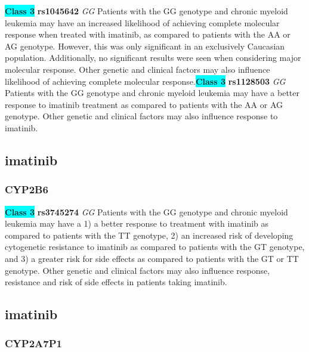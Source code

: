 \documentclass{book}
\begin{document}
\begin{center}
\textbf{\colorbox{cyan} {Class 3}} \textbf{ rs1045642 } \textit{ GG }
Patients with the GG genotype and chronic myeloid leukemia may have an increased likelihood of achieving complete molecular response when treated with imatinib, as compared to patients with the AA or AG genotype. However, this was only significant in an exclusively Caucasian population. Additionally, no significant results were seen when considering major molecular response. Other genetic and clinical factors may also influence likelihood of achieving complete molecular response.\textbf{\colorbox{cyan} {Class 3}} \textbf{ rs1128503 } \textit{ GG }
Patients with the GG genotype and chronic myeloid leukemia may have a better response to imatinib treatment as compared to patients with the AA or AG genotype. Other genetic and clinical factors may also influence response to imatinib. 


\end{center}\subsection{ imatinib }


\subsubsection{ CYP2B6 }

\begin{center}
\textbf{\colorbox{cyan} {Class 3}} \textbf{ rs3745274 } \textit{ GG }
Patients with the GG genotype and chronic myeloid leukemia may have a 1) a better response to treatment with imatinib as compared to patients with the TT genotype, 2) an increased risk of developing cytogenetic resistance to imatinib as compared to patients with the GT genotype, and 3) a greater risk for side effects as compared to patients with the GT or TT genotype. Other genetic and clinical factors may also influence response, resistance and risk of side effects in patients taking imatinib.


\end{center}\subsection{ imatinib }


\subsubsection{ CYP2A7P1 }
\end{document}
